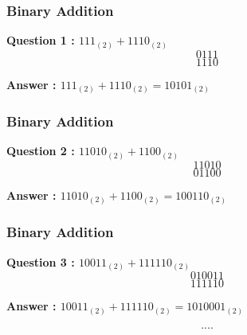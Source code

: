 \documentclass{beamer}
\begin{document}
\begin{frame}
\frametitle{Binary Addition}
\Large
\vspace{-1.2cm}
\textbf{Question 1 : $111_{(2)} + 1110_{(2)}$}
\huge
\[ 0 1 1 1\]
\[ 1 1 1 0\]



\vspace{2.5cm}
\large
\textbf{Answer : $111_{(2)} + 1110_{(2)} = 10101_{(2)}	$}
\end{frame}
\begin{frame}
\frametitle{Binary Addition}
\Large
\vspace{-1.2cm}
\textbf{Question 2 : $11010_{(2)} + 1100_{(2)}$}
\huge
\[ 11010\]
\[ 01100\]



\vspace{2.5cm}
\large
\textbf{Answer : $11010_{(2)} + 1100_{(2)} = 100110_{(2)}	$}
\end{frame}
\begin{frame}
\frametitle{Binary Addition}
\Large
\vspace{-1.2cm}
\textbf{Question 3 : $10011_{(2)} + 111110_{(2)}$}
\huge
\[ 010011\]
\[ 111110\]



\vspace{2.5cm}
\large
\textbf{Answer : $10011_{(2)} + 111110_{(2)} = 1010001_{(2)}$}
\end{frame}
\begin{frame}
\[....\]
\end{frame}
\end{document}
